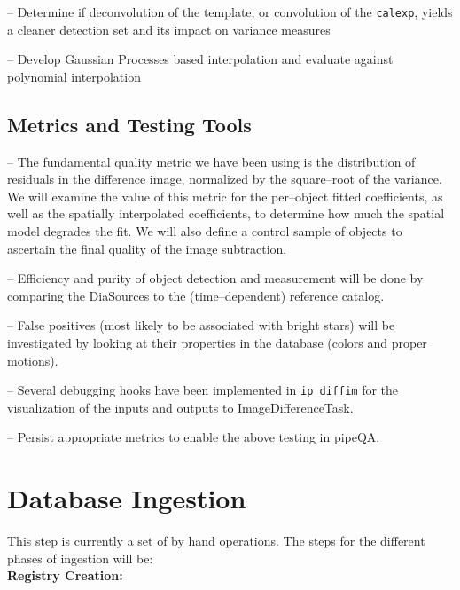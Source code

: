 \documentclass[prd, nofootinbib, floatfix, 11pt,tightenlines,times]{article}
\begin{document}
-- Determine if deconvolution of the template, or convolution of the {\tt calexp},
yields a cleaner detection set and its impact on variance measures

-- Develop Gaussian Processes based interpolation and
evaluate against polynomial interpolation

\subsection{Metrics and Testing Tools}

-- The fundamental quality metric we have been using is the
distribution of residuals in the difference image, normalized by the
square--root of the variance.  We will examine the value of this
metric for the per--object fitted coefficients, as well as the
spatially interpolated coefficients, to determine how much the spatial
model degrades the fit.  We will also define a control sample of
objects to ascertain the final quality of the image subtraction.



-- Efficiency and purity of object detection and measurement will be
done by comparing the DiaSources to the (time--dependent) reference
catalog.

-- False positives (most likely to be associated with bright stars)
will be investigated by looking at their properties in the database
(colors and proper motions).

-- Several debugging hooks have been implemented in {\tt ip\_diffim} for
the visualization of the inputs and outputs to ImageDifferenceTask.

-- Persist appropriate metrics to enable the above testing in pipeQA.


\section{Database Ingestion} 
This step is currently a set of by hand operations.  
The steps for the different phases of ingestion will be:\\

{\bf Registry Creation:}
\end{document}
